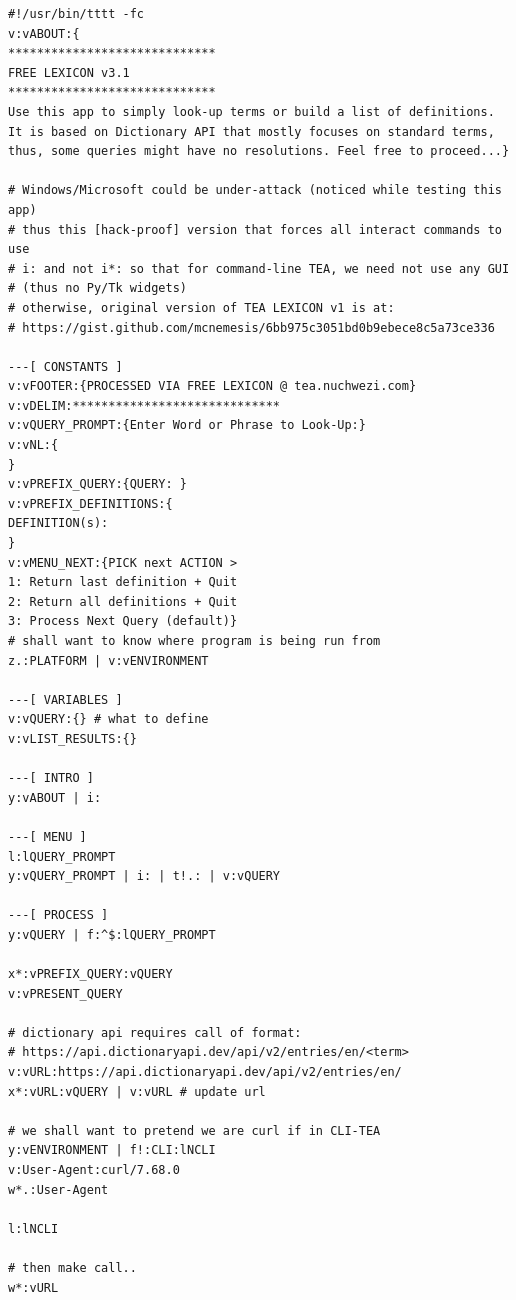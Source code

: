 \documentclass[a4paper, 18pt]{book} %
\begin{document}
{{{\vspace{2em}

   \vspace{1em}

  \begin{tcolorbox}[teaterminalstyle, title=TEA Application: Free Dictionary | LEXICON v3, breakable]
  \begin{lstlisting}[language=TEA,breaklines=true,]
#!/usr/bin/tttt -fc
v:vABOUT:{
*****************************
FREE LEXICON v3.1
*****************************
Use this app to simply look-up terms or build a list of definitions.
It is based on Dictionary API that mostly focuses on standard terms, thus, some queries might have no resolutions. Feel free to proceed...}

# Windows/Microsoft could be under-attack (noticed while testing this app)
# thus this [hack-proof] version that forces all interact commands to use 
# i: and not i*: so that for command-line TEA, we need not use any GUI 
# (thus no Py/Tk widgets)
# otherwise, original version of TEA LEXICON v1 is at:
# https://gist.github.com/mcnemesis/6bb975c3051bd0b9ebece8c5a73ce336

---[ CONSTANTS ]
v:vFOOTER:{PROCESSED VIA FREE LEXICON @ tea.nuchwezi.com}
v:vDELIM:*****************************
v:vQUERY_PROMPT:{Enter Word or Phrase to Look-Up:}
v:vNL:{
}
v:vPREFIX_QUERY:{QUERY: }
v:vPREFIX_DEFINITIONS:{
DEFINITION(s):
}
v:vMENU_NEXT:{PICK next ACTION > 
1: Return last definition + Quit
2: Return all definitions + Quit
3: Process Next Query (default)}
# shall want to know where program is being run from
z.:PLATFORM | v:vENVIRONMENT

---[ VARIABLES ]
v:vQUERY:{} # what to define
v:vLIST_RESULTS:{}

---[ INTRO ]
y:vABOUT | i:

---[ MENU ]
l:lQUERY_PROMPT
y:vQUERY_PROMPT | i: | t!.: | v:vQUERY

---[ PROCESS ]
y:vQUERY | f:^$:lQUERY_PROMPT

x*:vPREFIX_QUERY:vQUERY
v:vPRESENT_QUERY

# dictionary api requires call of format:
# https://api.dictionaryapi.dev/api/v2/entries/en/<term>
v:vURL:https://api.dictionaryapi.dev/api/v2/entries/en/
x*:vURL:vQUERY | v:vURL # update url

# we shall want to pretend we are curl if in CLI-TEA
y:vENVIRONMENT | f!:CLI:lNCLI
v:User-Agent:curl/7.68.0
w*.:User-Agent

l:lNCLI

# then make call..
w*:vURL


\end{lstlisting}
\end{tcolorbox}}}}
\end{document}
